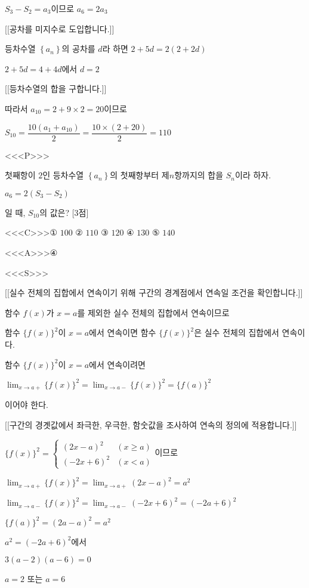 \documentclass{oblivoir}
\begin{document}
$S_{3}-S_{2}=a_{3}$이므로 $a_{6}= 2a_{3}$

[[공차를 미지수로 도입합니다.]]

등차수열 $\left\{a_{n}\right\}$의 공차를 $d$라 하면 $2+5d=2(2+2d)$

$2+5d=4+4d$에서 $d=2$

[[등차수열의 합을 구합니다.]]

따라서 $a_{10}= 2+ 9\times 2 =20$이므로

$S_{10}$$=\dfrac{10(a_{1}+a_{10})}{2}$$=\dfrac{10\times(2+20)}{2}$$=110$

<<<P>>>

첫째항이 $2$인 등차수열 $\left\{a_{n}\right\}$의 첫째항부터 제$n$항까지의 합을 $S_{n}$이라 하자.

$a_{6}= 2(S_{3}-S_{2})$

일 때, $S_{10}$의 값은? [3점]

<<<C>>>① $100$ ② $110$ ③ $120$ ④ $130$ ⑤ $140$

<<<A>>>④

<<<S>>>

[[실수 전체의 집합에서 연속이기 위해 구간의 경계점에서 연속일 조건을 확인합니다.]]

함수 $f(x)$가 $x=a$를 제외한 실수 전체의 집합에서 연속이므로

함수 $\{f(x)\}^{2}$이 $x=a$에서 연속이면 함수 $\{f(x)\}^{2}$은 실수 전체의 집합에서 연속이다.

함수 $\{f(x)\}^{2}$이 $x=a$에서 연속이려면 

$\displaystyle\lim_{x\to a+}\{f(x)\}^{2}=\displaystyle\lim_{x\to a-}\{f(x)\}^{2}=\{f(a)\}^{2}$

이어야 한다.

[[구간의 경곗값에서 좌극한, 우극한, 함숫값을 조사하여 연속의 정의에 적용합니다.]]

$\{f(x)\}^{2}=\begin{cases}
    (2x-a)^{2}&(x\ge a)\\
    (-2x+6)^{2}&(x< a)
    \end{cases}$이므로

$\displaystyle\lim_{x\to a+}\{f(x)\}^{2}=\displaystyle\lim_{x\to a+}(2x-a)^{2}=a^{2}$

$\displaystyle\lim_{x\to a-}\{f(x)\}^{2}=\displaystyle\lim_{x\to a-}(-2x+6)^{2}=(-2a+6)^{2}$

$\{f(a)\}^{2}=(2a-a)^{2}=a^{2}$

$a^{2}=(-2a+6)^{2}$에서

$3(a-2)(a-6)=0$

$a=2$ 또는 $a=6$
\end{document}
